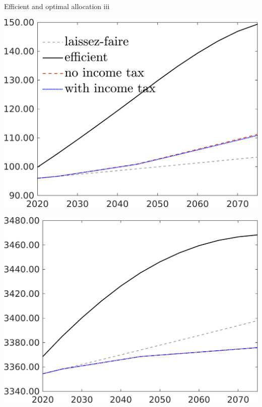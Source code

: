 \documentclass[11pt,aspectratio=169]{beamer}
\begin{document}
\begin{frame}{Efficient and optimal allocation iii}
	\hypertarget{effalloOthers}{}
	\centering
	
	\begin{minipage}[]{0.3\textwidth}
		\includegraphics[width=1\textwidth]{../codding_model/own_basedOnFried/optimalPol_elastS_DisuSci/figures/all_1705/Ag_CompEffOPT_T_NoTaus_spillover0_noskill0_sep1_BN0_ineq0_red0_xgrowth0_zero0_countec0_etaa0.79_lgd1_lff1.png}
	\end{minipage}
	\begin{minipage}[]{0.3\textwidth}
		\includegraphics[width=1\textwidth]{../codding_model/own_basedOnFried/optimalPol_elastS_DisuSci/figures/all_1705/Af_CompEffOPT_T_NoTaus_spillover0_noskill0_sep1_BN0_ineq0_red0_xgrowth0_zero0_countec0_etaa0.79_lgd0_lff1.png}

\end{minipage}
\end{frame}
\end{document}
